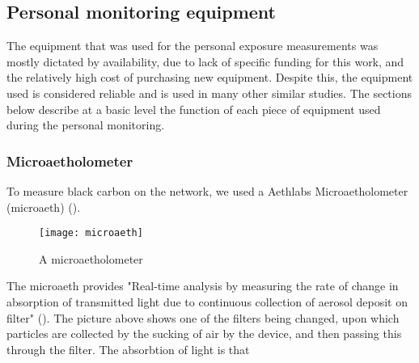 \subsection{Personal monitoring equipment}
\label{subsec:personal_monitoring_equipment}
The equipment that was used for the personal exposure measurements was mostly dictated by availability, due to lack of specific funding for this work, and the relatively high cost of purchasing new equipment. Despite this, the equipment used is considered reliable and is used in many other similar studies. The sections below describe at a basic level the function of each piece of equipment used during the personal monitoring.

\subsubsection{Microaetholometer}
To measure black carbon on the network, we used a Aethlabs Microaetholometer (microaeth) (\cite{Aethlabs2016}).

\begin{figure}[H]
\centering
\texttt{[image: microaeth]}
\caption{A microaetholometer}
\label{fig:microaeth}
\end{figure}

The microaeth provides "Real-time analysis by measuring the rate of change in absorption of transmitted light due to continuous collection of aerosol deposit on filter" (\cite{Aethlabs2016}). The picture above shows one of the filters being changed, upon which particles are collected by the sucking of air by the device, and then passing this through the filter. The absorbtion of light is that